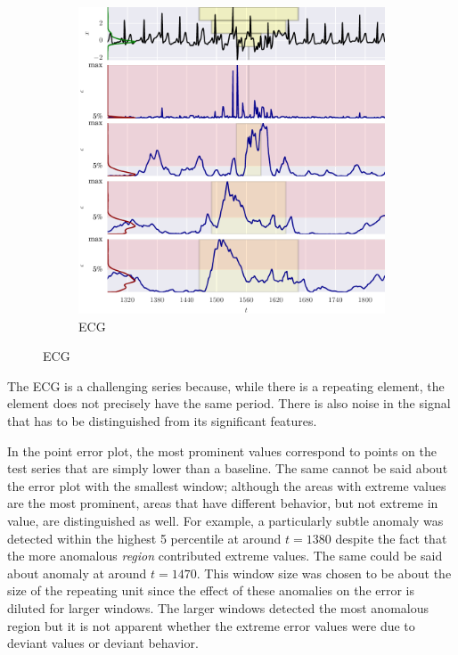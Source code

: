 \begin{figure}[H]
    \ContinuedFloat 

    \begin{subfigure}[t]{\textwidth} 
        \centering
        \includegraphics[]{figs/er_ecg.pdf}
        \caption{ECG}
    \end{subfigure}%

\end{figure}


The ECG is a challenging series because, while there is a repeating element, the element does not precisely have the same period.
%
There is also noise in the signal that has to be distinguished from its significant features.

In the point error plot, the most prominent values correspond to points on the test series that are simply lower than a baseline.
%
The same cannot be said about the error plot with the smallest window;
%
although the areas with extreme values are the most prominent, areas that have different behavior, but not extreme in value, are distinguished as well.
%
For example, a particularly subtle anomaly was detected within the highest 5 percentile at around $t=1380$ despite the fact that the more anomalous \emph{region} contributed extreme values.
%
The same could be said about anomaly at around $t=1470$.
%
This window size was chosen to be about the size of the repeating unit since the effect of these anomalies on the error is diluted for larger windows.
%
The larger windows detected the most anomalous region but it is not apparent whether the extreme error values were due to deviant values or deviant behavior.


